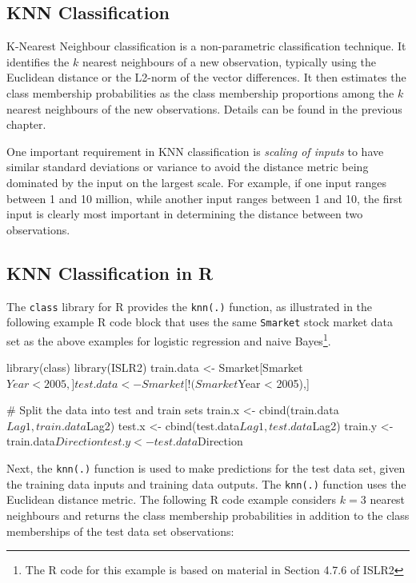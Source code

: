 \subsection{KNN Classification}

K-Nearest Neighbour classification is a non-parametric classification technique. It identifies the $k$ nearest neighbours of a new observation, typically using the Euclidean distance or the L2-norm of the vector differences. It then estimates the class membership probabilities as the class membership proportions among the $k$ nearest neighbours of the new observations. Details can be found in the previous chapter. 

One important requirement in KNN classification is \emph{scaling of inputs} to have similar standard deviations or variance to avoid the distance metric being dominated by the input on the largest scale. For example, if one input ranges between 1 and 10 million, while another input ranges between 1 and 10, the first input is clearly most important in determining the distance between two observations.

\subsection{KNN Classification in R}

The \texttt{class} library for R provides the \texttt{knn(.)} function, as illustrated in the following example R code block that uses the same \texttt{Smarket} stock market data set as the above examples for logistic regression and naive Bayes\footnote{The R code for this example is based on material in Section 4.7.6 of ISLR2}.

\begin{samepage}
\begin{Rcode}
library(class)
library(ISLR2)
train.data <- Smarket[Smarket$Year < 2005,]
test.data <- Smarket[!(Smarket$Year < 2005),]

# Split the data into test and train sets
train.x <- cbind(train.data$Lag1, train.data$Lag2)
test.x <- cbind(test.data$Lag1, test.data$Lag2)
train.y <- train.data$Direction
test.y <- test.data$Direction
\end{Rcode}
\end{samepage}

Next, the \texttt{knn(.)} function is used to make predictions for the test data set, given the training data inputs and training data outputs. The \texttt{knn(.)} function uses the Euclidean distance metric. The following R code example considers $k=3$ nearest neighbours and returns the class membership probabilities in addition to the class memberships of the test data set observations:

